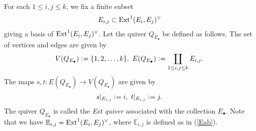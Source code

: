 \documentclass[11pt]{amsart}
\theoremstyle{plain}
\theoremstyle{definition}
\theoremstyle{remark}
\newcommand{\Ext}{\mathop{\rm Ext}\nolimits}
\begin{document}
For each $1\le i, j \le k$, 
we fix a finite subset
\begin{align}\notag
E_{i, j} \subset \Ext^1(E_i, E_j)^{\vee}
\end{align}
giving a basis of $\Ext^1(E_i, E_j)^{\vee}$. 
Let the quiver $Q_{E_{\bullet}}$ 
be defined as follows. 
The set of vertices and edges are given by 
\begin{align*}
V(Q_{E_{\bullet}}) \cneq \{1, 2, \ldots, k\}, \ 
E(Q_{E_{\bullet}}) \cneq \coprod_{1\le i, j \le k}
E_{i, j}. 
\end{align*}
The maps $s, t \colon 
E(Q_{E_{\bullet}}) \to V(Q_{E_{\bullet}})$
are given by 
\begin{align*}
s|_{E_{i, j}} \cneq i, \ t|_{E_{i, j}} \cneq j. 
\end{align*}
The quiver $Q_{E_{\bullet}}$ is called the 
\textit{Ext quiver} associated with the collection $E_{\bullet}$. 
Note that we have $\mathbb{E}_{i, j}=\Ext^1(E_i, E_j)^{\vee}$,  
where $\mathbb{E}_{i, j}$ is defined as in (\ref{Eab}). 
\end{document}
